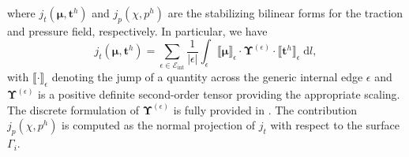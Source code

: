 \documentclass[3p,times]{elsarticle}
\theoremstyle{plain}
\newcommand{\tensorTwo}[1]{\boldsymbol#1}
\begin{document}
where $j_t ( \tensorTwo{\mu}, \tensorTwo{t}^h )$ and $j_p ( \chi, p^h )$ are the stabilizing bilinear forms
for the traction and pressure field, respectively.
In particular, we have
\begin{equation}
  j_t \left( \tensorTwo{\mu}, \tensorTwo{t}^h \right)
  = \sum_{\epsilon \in \mathcal{E}_{\text{int}}}
    \frac{1}{|\epsilon|}
    \int_{\epsilon}
    \llbracket \tensorTwo{\mu} \rrbracket_{\epsilon}
    \cdot
    \tensorTwo{\Upsilon}^{(\epsilon)}
    \cdot
    \llbracket \tensorTwo{t}^h \rrbracket_{\epsilon}
    \; \mathrm{d}l,
    \label{eq:jump_bilinear_form}
\end{equation}
with $\llbracket \cdot \rrbracket_{\epsilon}$ denoting the jump of a quantity across
the generic internal edge $\epsilon$ and $\tensorTwo{\Upsilon}^{(\epsilon)}$ is a
positive definite second-order tensor providing the appropriate scaling. The discrete
formulation of $\tensorTwo{\Upsilon}^{(\epsilon)}$ is fully provided in
\cite{fr2020alg}. 
The contribution $j_p ( {\chi}, {p}^h ) $ is computed as the normal projection of $j_t$ with respect to the surface $\Gamma_i$.
\end{document}
